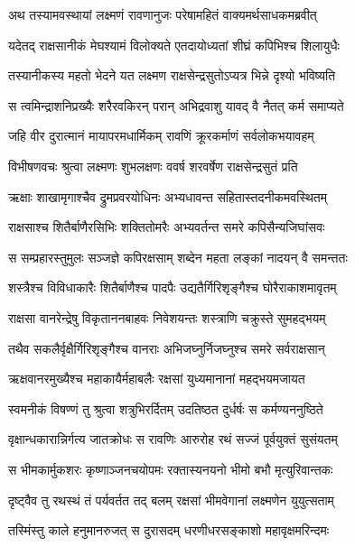 
\twolineshloka
{अथ तस्यामवस्थायां लक्ष्मणं रावणानुजः}
{परेषामहितं वाक्यमर्थसाधकमब्रवीत्} %

\twolineshloka
{यदेतद् राक्षसानीकं मेघश्यामं विलोक्यते}
{एतदायोध्यतां शीघ्रं कपिभिश्च शिलायुधैः} %

\twolineshloka
{तस्यानीकस्य महतो भेदने यत लक्ष्मण}
{राक्षसेन्द्रसुतोऽप्यत्र भिन्ने दृश्यो भविष्यति} %

\twolineshloka
{स त्वमिन्द्राशनिप्रख्यैः शरैरवकिरन् परान्}
{अभिद्रवाशु यावद् वै नैतत् कर्म समाप्यते} %

\twolineshloka
{जहि वीर दुरात्मानं मायापरमधार्मिकम्}
{रावणिं क्रूरकर्माणं सर्वलोकभयावहम्} %

\twolineshloka
{विभीषणवचः श्रुत्वा लक्ष्मणः शुभलक्षणः}
{ववर्ष शरवर्षेण राक्षसेन्द्रसुतं प्रति} %

\twolineshloka
{ऋक्षाः शाखामृगाश्चैव द्रुमप्रवरयोधिनः}
{अभ्यधावन्त सहितास्तदनीकमवस्थितम्} %

\twolineshloka
{राक्षसाश्च शितैर्बाणैरसिभिः शक्तितोमरैः}
{अभ्यवर्तन्त समरे कपिसैन्यजिघांसवः} %

\twolineshloka
{स सम्प्रहारस्तुमुलः सञ्जज्ञे कपिरक्षसाम्}
{शब्देन महता लङ्कां नादयन् वै समन्ततः} %

\twolineshloka
{शस्त्रैश्च विविधाकारैः शितैर्बाणैश्च पादपैः}
{उद्यतैर्गिरिशृङ्गैश्च घोरैराकाशमावृतम्} %

\twolineshloka
{राक्षसा वानरेन्द्रेषु विकृताननबाहवः}
{निवेशयन्तः शस्त्राणि चक्रुस्ते सुमहद्भयम्} %

\twolineshloka
{तथैव सकलैर्वृक्षैर्गिरिशृङ्गैश्च वानराः}
{अभिजघ्नुर्निजघ्नुश्च समरे सर्वराक्षसान्} %

\twolineshloka
{ऋक्षवानरमुख्यैश्च महाकायैर्महाबलैः}
{रक्षसां युध्यमानानां महद्भयमजायत} %

\twolineshloka
{स्वमनीकं विषण्णं तु श्रुत्वा शत्रुभिरर्दितम्}
{उदतिष्ठत दुर्धर्षः स कर्मण्यननुष्ठिते} %

\twolineshloka
{वृक्षान्धकारान्निर्गत्य जातक्रोधः स रावणिः}
{आरुरोह रथं सज्जं पूर्वयुक्तं सुसंयतम्} %

\twolineshloka
{स भीमकार्मुकशरः कृष्णाञ्जनचयोपमः}
{रक्तास्यनयनो भीमो बभौ मृत्युरिवान्तकः} %

\twolineshloka
{दृष्ट्वैव तु रथस्थं तं पर्यवर्तत तद् बलम्}
{रक्षसां भीमवेगानां लक्ष्मणेन युयुत्सताम्} %

\twolineshloka
{तस्मिंस्तु काले हनुमानरुजत् स दुरासदम्}
{धरणीधरसङ्काशो महावृक्षमरिन्दमः} %

